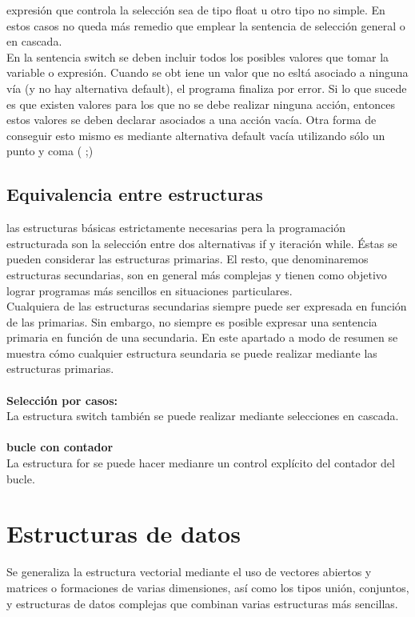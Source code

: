 \documentclass[11pt,a4paper]{article}
\begin{document}
  expresión que controla la selección sea de tipo float u otro tipo no simple.
  En estos casos no queda más remedio que emplear la sentencia de selección
  general o en cascada.\\
  En la sentencia switch se deben incluir todos los posibles valores que tomar la variable o expresión. Cuando se obt iene un valor que no esltá asociado
  a ninguna vía (y no hay alternativa default), el programa finaliza por error.
  Si lo que sucede es que existen valores para los que no se debe realizar ninguna acción, entonces estos valores se deben declarar asociados a una acción vacía. Otra forma de conseguir esto mismo es mediante alternativa default
  vacía utilizando sólo un punto y coma ( ;)
  \subsection{Equivalencia entre estructuras}
  las estructuras básicas estrictamente necesarias
  pera la programación estructurada son la selección entre dos alternativas if y
  iteración while. Éstas se pueden considerar las estructuras primarias. El
  resto, que denominaremos estructuras secundarias, son en general más complejas
  y tienen como objetivo lograr programas más sencillos en situaciones particulares.\\
  Cualquiera de las estructuras secundarias siempre puede ser expresada en función
  de las primarias. Sin embargo, no siempre es posible expresar una sentencia
  primaria en función de una secundaria. En este apartado a modo de resumen se muestra cómo cualquier estructura
  seundaria se puede realizar mediante las estructuras primarias.\\
  \\
  \textbf{Selección por casos:}\\
  La estructura switch también se puede realizar mediante selecciones en cascada. \\
  \\
  \textbf{bucle con contador}\\
  La estructura for se puede hacer medianre un control explícito del contador del bucle.
  \section{Estructuras de datos}
  Se generaliza la estructura vectorial mediante el uso de vectores
  abiertos y matrices o formaciones de varias dimensiones, así como los
  tipos unión, conjuntos, y estructuras de datos complejas que combinan varias
  estructuras más sencillas.
\end{document}
